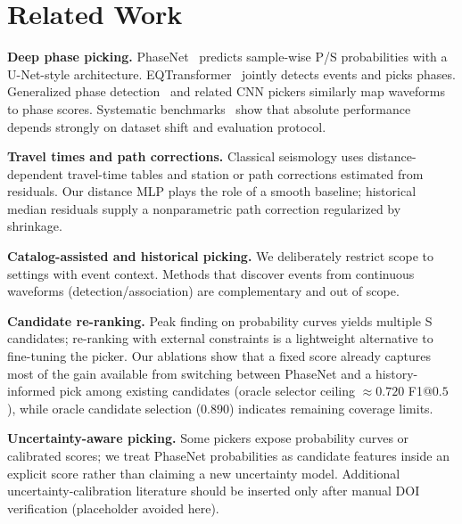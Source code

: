 \section{Related Work}
\label{sec:related}

\textbf{Deep phase picking.}
PhaseNet~\citep{zhu2019phasenet} predicts sample-wise P/S probabilities with a
U-Net-style architecture.
EQTransformer~\citep{mousavi2020eqt} jointly detects events and picks phases.
Generalized phase detection~\citep{ross2018gpd} and related CNN pickers
similarly map waveforms to phase scores.
Systematic benchmarks~\citep{munchmeyer2022benchmark,woollam2022seisbench}
show that absolute performance depends strongly on dataset shift and evaluation
protocol.

\textbf{Travel times and path corrections.}
Classical seismology uses distance-dependent travel-time tables and station or
path corrections estimated from residuals.
Our distance MLP plays the role of a smooth baseline; historical median
residuals supply a nonparametric path correction regularized by shrinkage.

\textbf{Catalog-assisted and historical picking.}
We deliberately restrict scope to settings with event context.
Methods that discover events from continuous waveforms (detection/association)
are complementary and out of scope.

\textbf{Candidate re-ranking.}
Peak finding on probability curves yields multiple S candidates; re-ranking
with external constraints is a lightweight alternative to fine-tuning the
picker.
Our ablations show that a fixed score already captures most of the gain
available from switching between PhaseNet and a history-informed pick among
existing candidates (oracle selector ceiling $\approx 0.720$ F1@$0.5$), while
oracle candidate selection ($0.890$) indicates remaining coverage limits.

\textbf{Uncertainty-aware picking.}
Some pickers expose probability curves or calibrated scores; we treat PhaseNet
probabilities as candidate features inside an explicit score rather than
claiming a new uncertainty model.
Additional uncertainty-calibration literature should be inserted only after
manual DOI verification (placeholder avoided here).
